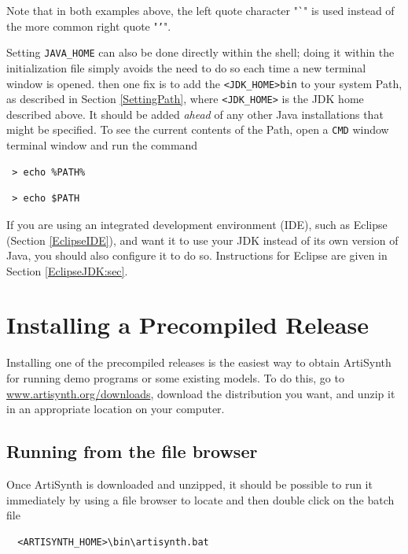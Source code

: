 Note that in both examples above, the left quote character "{\tt \`{}}" is used
instead of the more common right quote "{\tt '}".

Setting {\tt JAVA\_HOME} can also be done directly within the shell;
doing it within the initialization file simply avoids the need to do
so each time a new terminal window is opened.
\else %
then one fix is to add the \directory{} {\tt <JDK\_HOME>\SEP bin} to
your system Path, as described in Section \ref{SettingPath},
where {\tt <JDK\_HOME>} is the JDK home \directory{} described above.
It should be added {\it ahead} of any other Java installations that
might be specified. To see the current contents of the Path, open a
\ifWindows
{\tt CMD} window
\else
terminal window
\fi
and run the command
\ifWindows
\begin{verbatim}
 > echo %PATH%
\end{verbatim}
\else
\begin{verbatim}
 > echo $PATH
\end{verbatim}
\fi
\fi %

\begin{sideblock}
If you are using an integrated development environment (IDE), such as
Eclipse (Section \ref{EclipseIDE}), and want it to use your JDK
instead of its own version of Java, you should also configure it to
do so. Instructions for Eclipse are given in Section
\ref{EclipseJDK:sec}.
\end{sideblock}

\section{Installing a Precompiled Release}
\label{PrecompiledRelease}

Installing one of the precompiled releases is the easiest way to
obtain ArtiSynth for running demo programs or some existing models.
To do this, go to \href{http://www.artisynth.org/downloads}%
{www.artisynth.org/downloads}, download the distribution you want, and
unzip it in an appropriate location on your computer.

\ifLinux
\else %
\subsection{Running from the file browser}
\label{runningFileBrowser}

Once ArtiSynth is downloaded and unzipped, it should be possible to
run it immediately by using a file browser to locate and then
double click on the batch file
\ifWindows
\begin{verbatim}
  <ARTISYNTH_HOME>\bin\artisynth.bat
\end{verbatim}

